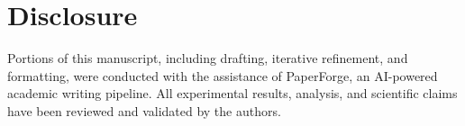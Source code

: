 \documentclass[conference]{IEEEtran}
\theoremstyle{plain}
\begin{document}
\section*{Disclosure}
\label{sec:disclosure}
Portions of this manuscript, including drafting, iterative refinement, and
formatting, were conducted with the assistance of PaperForge, an AI-powered
academic writing pipeline. All experimental results, analysis, and scientific
claims have been reviewed and validated by the authors.



\end{document}
